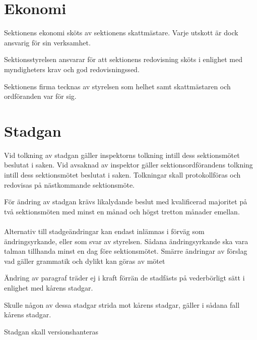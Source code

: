 \documentclass[stadgar]{dsekprotokoll}
\begin{document}
\section{Ekonomi}

\begin{stadgeavsnitt}


Sektionens ekonomi sköts av sektionens skattmästare. Varje utskott är dock
ansvarig för sin verksamhet.


Sektionsstyrelsen ansvarar för att sektionens redovisning sköts i enlighet
med myndigheters krav och god redovisningssed.


Sektionens firma tecknas av styrelsen som helhet samt skattmästaren och ordföranden
var för sig.

\end{stadgeavsnitt}

\section{Stadgan}

\begin{stadgeavsnitt}


Vid tolkning av stadgan gäller inspektorns tolkning intill dess
sektionsmötet beslutat i saken. Vid avsaknad av inspektor gäller
sektionsordförandens tolkning intill dess sektionsmötet beslutat i saken.
Tolkningar skall protokollföras och redovisas på nästkommande
sektionsmöte.


För ändring av stadgan krävs likalydande beslut med kvalificerad majoritet
på två sektionsmöten med minst en månad och högst tretton månader emellan.
\\\\
Alternativ till stadgeändringar kan endast inlämnas i förväg som ändringsyrkande, eller som svar av styrelsen. Sådana ändringsyrkande ska vara talman tillhanda minst en dag före sektionsmötet. Smärre ändringar av förslag vad gäller grammatik och dylikt kan göras av mötet


Ändring av paragraf träder ej i kraft förrän de stadfästs på vederbörligt
sätt i enlighet med kårens stadgar.


Skulle någon av dessa stadgar strida mot kårens stadgar, gäller i sådana
fall kårens stadgar.

Stadgan skall versionshanteras

\end{stadgeavsnitt}
\end{document}
